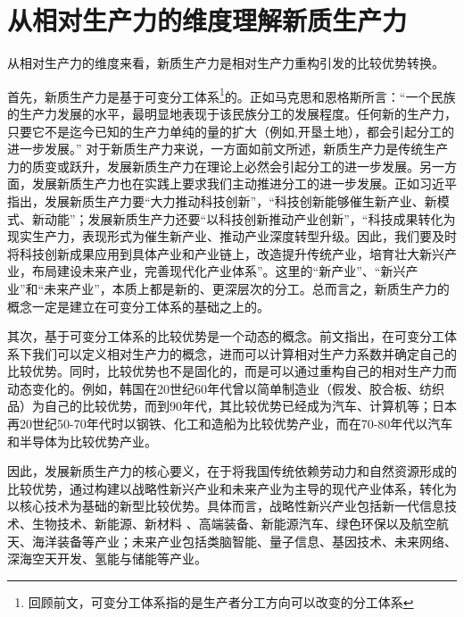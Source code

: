 \section{从相对生产力的维度理解新质生产力}

从相对生产力的维度来看，新质生产力是相对生产力重构引发的比较优势转换。

首先，新质生产力是基于可变分工体系\footnote{回顾前文，可变分工体系指的是生产者分工方向可以改变的分工体系}的。正如马克思和恩格斯所言：“一个民族的生产力发展的水平，最明显地表现于该民族分工的发展程度。任何新的生产力，只要它不是迄今已知的生产力单纯的量的扩大（例如,开垦土地），都会引起分工的进一步发展。” \cite[520]{ZhongGongZhongYangMaKeSiEnGeSiLieNingSiDaLinZhuZuoBianYiJuMaKeSiEnGeSiWenJiDi1Juan2009}对于新质生产力来说，一方面如前文所述，新质生产力是传统生产力的质变或跃升，发展新质生产力在理论上必然会引起分工的进一步发展\cite[141]{ZhangLinXinZhiShengChanLiDeNeiHanTeZhengLiLunChuangXinYuJieZhiYiYun2023}。另一方面，发展新质生产力也在实践上要求我们主动推进分工的进一步发展。正如习近平指出，发展新质生产力要“大力推动科技创新”，“科技创新能够催生新产业、新模式、新动能”；发展新质生产力还要“以科技创新推动产业创新”，“科技成果转化为现实生产力，表现形式为催生新产业、推动产业深度转型升级。因此，我们要及时将科技创新成果应用到具体产业和产业链上，改造提升传统产业，培育壮大新兴产业，布局建设未来产业，完善现代化产业体系”。\cite[516]{XiJinPingXiJinPingJingJiWenXuanDiYiJuan2025}这里的“新产业”、“新兴产业”和“未来产业”，本质上都是新的、更深层次的分工。总而言之，新质生产力的概念一定是建立在可变分工体系的基础之上的。

其次，基于可变分工体系的比较优势是一个动态的概念。前文指出，在可变分工体系下我们可以定义相对生产力的概念，进而可以计算相对生产力系数并确定自己的比较优势。同时，比较优势也不是固化的，而是可以通过重构自己的相对生产力而动态变化的\cite[69-70]{LiuLeYiJingTaiBiJiaoYouShiDongTaiHuaDeQuDongLiYuLiShiJingYanJianLunFaZhanXinZhiShengChanLiYuTiShengChanYeLianGongYingLianRenXingNeiYin2025}。例如，韩国在20世纪60年代曾以简单制造业（假发、胶合板、纺织品）为自己的比较优势，而到90年代，其比较优势已经成为汽车、计算机等\cite[43]{westphalIndustrialPolicyExport1990}；日本再20世纪50-70年代时以钢铁、化工和造船为比较优势产业，而在70-80年代以汽车和半导体为比较优势产业\cite[278]{itoEastAsianMiracle1994}。

因此，发展新质生产力的核心要义，在于将我国传统依赖劳动力和自然资源形成的比较优势，通过构建以战略性新兴产业和未来产业为主导的现代产业体系\cite[29]{CaiJiMingXinZhiShengChanLiDeFaZhanDuiJieZhiChuangZaoHeJingJiZengChangDeGongXian2024}\cite{WuKeDaLiTuiJinXianDaiHuaChanYeTiXiJianSheJiaKuaiFaZhanXinZhiShengChanLi2024}\cite[18-20]{HuangQunHuiXinZhiShengChanLiXiTongYaoSuTeZhiJieGouChengZaiYuGongNengQuXiang2024}，转化为以核心技术为基础的新型比较优势\cite[6]{ZhouWenLunXinZhiShengChanLiNeiHanTeZhengYuChongYaoZhaoLiDian2023}。具体而言，战略性新兴产业包括新一代信息技术、生物技术、新能源、新材料 、高端装备、新能源汽车、绿色环保以及航空航天、海洋装备等产业；未来产业包括类脑智能、量子信息、基因技术、未来网络、深海空天开发、氢能与储能等产业\cite[24]{QuanGuoRenMinDaiBiaoDaHuiZhongHuaRenMinGongHeGuoGuoMinJingJiHeSheHuiFaZhanDiShiSiGeWuNianGuiHuaHe2035NianYuanJingMuBiaoGangYao2021}。

